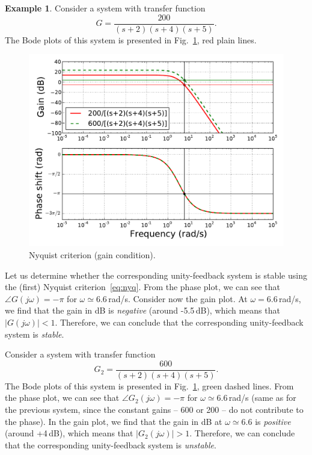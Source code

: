 \documentclass[a4paper,11pt]{report}
\theoremstyle{definition}
\newtheorem{mdexample}{Example}
\newenvironment{example}%
  {\vspace{0.1cm}\begin{mdframed}[backgroundcolor=lightgray]\begin{mdexample}}%
  {\end{mdexample}\end{mdframed}\vspace{0.1cm}}
\begin{document}
\begin{example}
  \label{ex:nyq}
  Consider a system with transfer function 
  \[
  G=\frac{200}{(s+2)(s+4)(s+5)}.
  \]
  The Bode plots of this system is presented in
  Fig.~\ref{fig:bode-nyq}, red plain lines.
  \begin{figure}[H]
    \centering
    \includegraphics[width=12cm]{fig/bode-nyq.pdf}
    \caption{Nyquist criterion (gain condition).}
    \label{fig:bode-nyq}
  \end{figure}

  Let us determine whether the corresponding unity-feedback system is
  stable using the (first) Nyquist criterion~\ref{eq:nyq}. From the
  phase plot, we can see that $\angle G(j\omega) = -\pi$ for
  $\omega\simeq 6.6$\,rad/s. Consider now the gain plot. At
  $\omega=6.6$\,rad/s, we find that the gain in dB is \emph{negative}
  (around -5.5\,dB), which means that $|G(j\omega)|<1$. Therefore,
  we can conclude that the corresponding unity-feedback system is
  \emph{stable}.

  Consider a system with transfer function 
  \[
  G_2=\frac{600}{(s+2)(s+4)(s+5)}.
  \]
  The Bode plots of this system is presented in
  Fig.~\ref{fig:bode-nyq}, green dashed lines. From the phase plot, we
  can see that $\angle G_2(j\omega) = -\pi$ for $\omega\simeq
  6.6$\,rad/s (same as for the previous system, since the constant
  gains -- 600 or 200 -- do not contribute to the phase). In the gain
  plot, we find that the gain in dB at $\omega\simeq 6.6$ is
  \emph{positive} (around +4\,dB), which means that
  $|G_2(j\omega)|>1$. Therefore, we can conclude that the
  corresponding unity-feedback system is \emph{unstable}.
\end{example}
\end{document}

